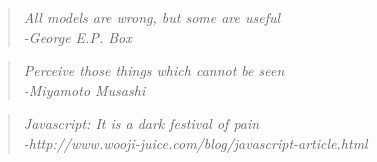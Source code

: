 \begin{quote}
\begin{center}

\emph{
All models are wrong, but some are useful
\\ -George E.P. Box
}
\end{center}
\end{quote}
\medskip
\begin{quote}
\begin{center}
\emph{
Perceive those things which cannot be seen
\\ -Miyamoto Musashi
}
\end{center}
\end{quote}
\medskip
\begin{quote}
\begin{center}
\emph{
Javascript: It is a dark festival of pain
\\ -http://www.wooji-juice.com/blog/javascript-article.html
}
\end{center}
\end{quote}
